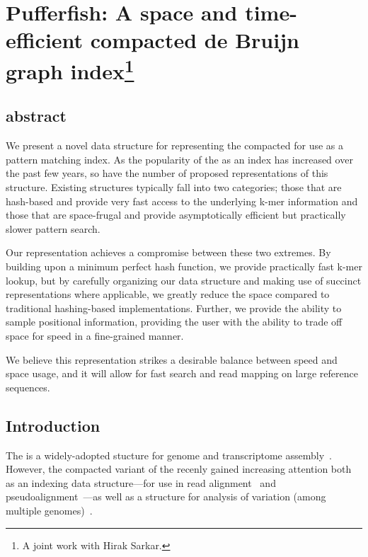 \chapter{Pufferfish: A space and time-efficient compacted de Bruijn graph index\protect\footnote{A joint work with Hirak Sarkar.}}
\label{sec:pufferfish}
\section{abstract}
  We present a novel data structure for representing the compacted \dbg for use
  as a pattern matching index. As the popularity of the \dbg as an index has
  increased over the past few years, so have the number of proposed
  representations of this structure. Existing structures typically fall into two
  categories; those that are hash-based and provide very fast access to the
  underlying k-mer information and those that are space-frugal and provide
  asymptotically efficient but practically slower pattern search.

  Our representation achieves a compromise between these two extremes. By
  building upon a minimum perfect hash function, we provide practically fast
  k-mer lookup, but by carefully organizing our data structure and making use of
  succinct representations where applicable, we greatly reduce the space
  compared to traditional hashing-based implementations. Further, we provide the
  ability to sample positional information, providing the user with the ability
  to trade off space for speed in a fine-grained manner.

  We believe this representation strikes a desirable balance between speed and
  space usage, and it will allow for fast search and read mapping on large
  reference sequences.



\section{Introduction}\label{sec:intro}

The \dbg is a widely-adopted stucture for genome and transcriptome
assembly~\cite{grabherr2011full,pevzner2001eulerian,haas2013novo}. However, the
compacted variant of the \dbg recenly gained increasing attention both as an indexing
data structure---for use in read alignment~\cite{liu2016debga} and
pseudoalignment~\cite{Bray2016Kallisto}---as well as a structure for analysis of
variation (among multiple genomes)~\cite{minkin2016twopaco}.


